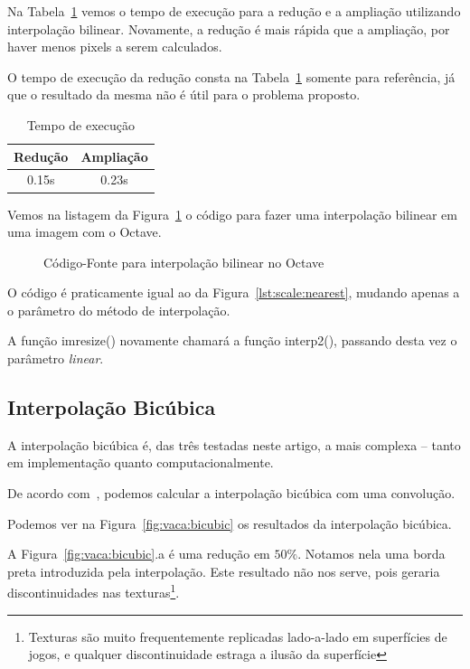 \documentclass[12pt]{article}
\begin{document}
Na Tabela~\ref{tab:bilinear} vemos o tempo de execução para a redução e a ampliação utilizando interpolação bilinear. Novamente, a redução é mais rápida que a ampliação, por haver menos pixels a serem calculados.

O tempo de execução da redução consta na Tabela~\ref{tab:bilinear} somente para referência, já que o resultado da mesma não é útil para o problema proposto.

\begin{table}[H]
    \caption{Tempo de execução}
    \centering
    \label{tab:bilinear}
    \begin{tabular}{c||c}
     Redução & Ampliação \\
     \hline
     0.15s & 0.23s
    \end{tabular}
\end{table}

Vemos na listagem da Figura~\ref{lst:scale:linear} o código para fazer uma interpolação bilinear em uma imagem com o Octave.

\begin{figure}[H]

\caption{Código-Fonte para interpolação bilinear no Octave}
\label{lst:scale:linear}
\end{figure}

O código é praticamente igual ao da Figura~\ref{lst:scale:nearest}, mudando apenas a o parâmetro do método de interpolação.

A função \textsf{imresize()} novamente chamará a função \textsf{interp2()}, passando desta vez o parâmetro \emph{linear}.


\subsection{Interpolação Bicúbica}\label{sec:redimensionamento:bicubica}

A interpolação bicúbica é, das três testadas neste artigo, a mais complexa -- tanto em implementação quanto computacionalmente.~\cite{han2013}

De acordo com~\cite{keys:1981}, podemos calcular a interpola\c{c}ão bicúbica com uma convolu\c{c}ão.

Podemos ver na Figura~\ref{fig:vaca:bicubic} os resultados da interpolação bicúbica.

A Figura~\ref{fig:vaca:bicubic}.a é uma redução em $50\%$. Notamos nela uma borda preta introduzida pela interpolação. Este resultado não nos serve, pois geraria discontinuidades nas texturas\footnote{Texturas são muito frequentemente replicadas lado-a-lado em superfícies de jogos, e qualquer discontinuidade estraga a ilusão da superfície}.
\end{document}
